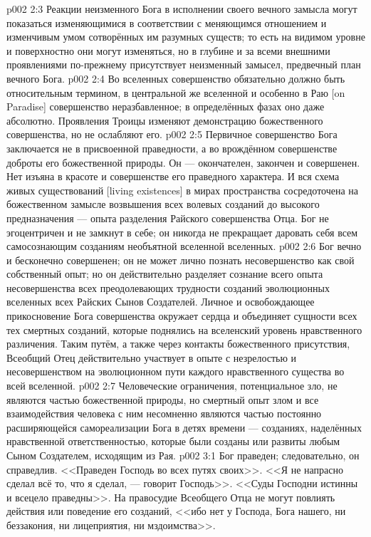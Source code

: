\vs p002 2:3 \pc Реакции неизменного Бога в исполнении своего вечного замысла могут показаться изменяющимися в соответствии с меняющимся отношением и изменчивым умом сотворённых им разумных существ; то есть на видимом уровне и поверхностно они могут изменяться, но в глубине и за всеми внешними проявлениями по\hyp{}прежнему присутствует неизменный замысел, предвечный план вечного Бога.
\vs p002 2:4 Во вселенных совершенство обязательно должно быть относительным термином, в центральной же вселенной и особенно в Раю [on Paradise] совершенство неразбавленное; в определённых фазах оно даже абсолютно. Проявления Троицы изменяют демонстрацию божественного совершенства, но не ослабляют его.
\vs p002 2:5 \pc Первичное совершенство Бога заключается не в присвоенной праведности, а во врождённом совершенстве доброты его божественной природы. Он --- окончателен, закончен и совершенен. Нет изъяна в красоте и совершенстве его праведного характера. И вся схема живых существований [living existences] в мирах пространства сосредоточена на божественном замысле возвышения всех волевых созданий до высокого предназначения --- опыта разделения Райского совершенства Отца. Бог не эгоцентричен и не замкнут в себе; он никогда не прекращает даровать себя всем самосознающим созданиям необъятной вселенной вселенных.
\vs p002 2:6 Бог вечно и бесконечно совершенен; он не может лично познать несовершенство как свой собственный опыт; но он действительно разделяет сознание всего опыта несовершенства всех преодолевающих трудности созданий эволюционных вселенных всех Райских Сынов Создателей. Личное и освобождающее прикосновение Бога совершенства окружает сердца и объединяет сущности всех тех смертных созданий, которые поднялись на вселенский уровень нравственного различения. Таким путём, а также через контакты божественного присутствия, Всеобщий Отец действительно участвует в опыте  с незрелостью и несовершенством на эволюционном пути каждого нравственного существа во всей вселенной.
\vs p002 2:7 Человеческие ограничения, потенциальное зло, не являются частью божественной природы, но смертный опыт  злом и все взаимодействия человека с ним несомненно являются частью постоянно расширяющейся самореализации Бога в детях времени --- созданиях, наделённых нравственной ответственностью, которые были созданы или развиты любым Сыном Создателем, исходящим из Рая.
\vs p002 3:1 Бог праведен; следовательно, он справедлив. <<Праведен Господь во всех путях своих>>. <<Я не напрасно сделал всё то, что я сделал, --- говорит Господь>>. <<Суды Господни истинны и всецело праведны>>. На правосудие Всеобщего Отца не могут повлиять действия или поведение его созданий, <<ибо нет у Господа, Бога нашего, ни беззакония, ни лицеприятия, ни мздоимства>>.
